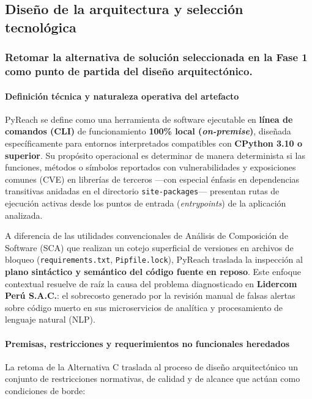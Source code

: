 

\subsection{Diseño de la arquitectura y selección tecnológica}
\subsubsection{Retomar la alternativa de solución seleccionada en la Fase 1 como punto de partida del diseño arquitectónico.}
\paragraph*{Definición técnica y naturaleza operativa del artefacto}
PyReach se define como una herramienta de software ejecutable en \textbf{línea de comandos (CLI)} de funcionamiento \textbf{100\% local (\textit{on-premise})}, diseñada específicamente para entornos interpretados compatibles con \textbf{CPython 3.10 o superior}. Su propósito operacional es determinar de manera determinista si las funciones, métodos o símbolos reportados con vulnerabilidades y exposiciones comunes (CVE) en librerías de terceros ---con especial énfasis en dependencias transitivas anidadas en el directorio \texttt{site-\allowbreak packages}--- presentan rutas de ejecución activas desde los puntos de entrada (\textit{entrypoints}) de la aplicación analizada.

A diferencia de las utilidades convencionales de Análisis de Composición de Software (SCA) que realizan un cotejo superficial de versiones en archivos de bloqueo (\texttt{requirements.\allowbreak txt}, \texttt{Pipfile.\allowbreak lock}), PyReach traslada la inspección al \textbf{plano sintáctico y semántico del código fuente en reposo}. Este enfoque contextual resuelve de raíz la causa del problema diagnosticado en \textbf{Lidercom Perú S.A.C.}: el sobrecosto generado por la revisión manual de falsas alertas sobre código muerto en sus microservicios de analítica y procesamiento de lenguaje natural (NLP).

\paragraph*{Premisas, restricciones y requerimientos no funcionales heredados}
La retoma de la Alternativa C traslada al proceso de diseño arquitectónico un conjunto de restricciones normativas, de calidad y de alcance que actúan como condiciones de borde:

